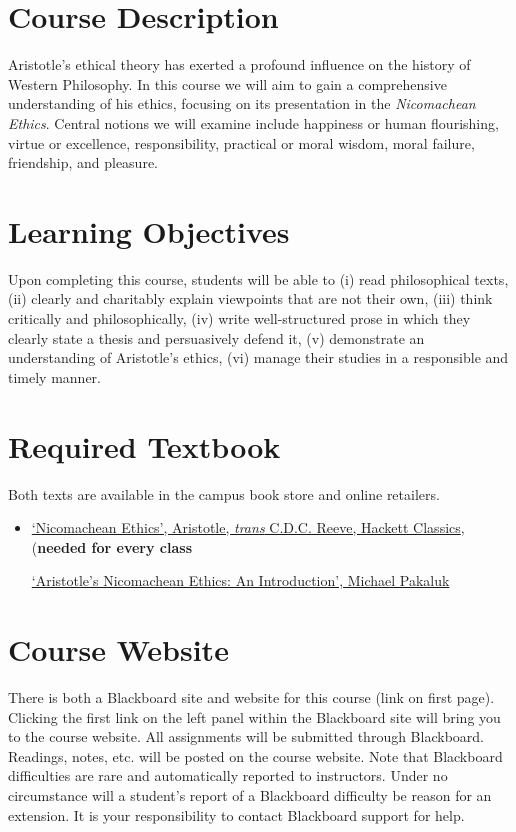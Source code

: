 \documentclass[article,oneside]{memoir}
\begin{document}
\section{Course Description}

Aristotle's ethical theory has exerted a profound influence on the history of Western Philosophy.  In this course we will aim to gain a comprehensive understanding of his ethics, focusing on its presentation in the \emph{Nicomachean Ethics}.  Central notions we will examine include happiness or human  flourishing, virtue or excellence, responsibility, practical or moral wisdom, moral failure, friendship,  and pleasure.   


\section{Learning Objectives}

Upon completing this course, students will be able to (i) read philosophical texts, (ii) clearly and charitably explain viewpoints that are not their own, (iii) think critically and philosophically, (iv)
write well-structured prose in which they clearly state a thesis and persuasively defend it, (v) demonstrate an understanding of Aristotle's ethics, (vi) manage their studies in a responsible and timely manner. 




\section{Required Textbook}

Both texts are available in the campus book store and online retailers.

\begin{itemize}
\item
\href{https://www.amazon.com/Nicomachean-Ethics-Hackett-Classics-Aristotle/dp/1624661173/ref=sr_1_16?ie=UTF8&qid=1473024493&sr=8-16&keywords=aristotle%27s+nicomachean+ethics}{`Nicomachean Ethics', Aristotle, \emph{trans} C.D.C. Reeve, Hackett Classics}, (\textbf{needed for every class}

  \href{https://www.amazon.com/Aristotles-Nicomachean-Ethics-Introductions-Philosophical/dp/0521520681/ref=sr_1_1?ie=UTF8&qid=1473039378&sr=8-1&keywords=nicomachean+ethics+pakaluk}{`Aristotle's Nicomachean Ethics: An Introduction', Michael Pakaluk} 
\end{itemize}


\section{Course Website}
There is both a Blackboard site and website for this course (link on first page). Clicking the first link on the left panel within the Blackboard site will bring you to the course website. All assignments will be submitted through Blackboard. Readings, notes, etc. will be posted on the course website. Note that Blackboard difficulties are rare and automatically reported to instructors. Under no circumstance will a student's report of a Blackboard difficulty be reason for an extension. It is your responsibility to contact Blackboard support for help.
\end{document}
